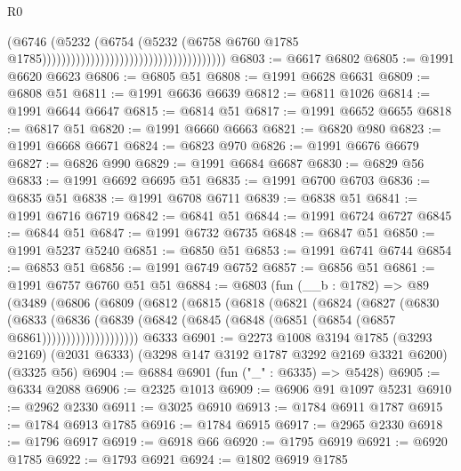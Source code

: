 \begin{lexlean}{R0}
\begin{coremodule}
                                                                      (@6746
                                                                        (@5232
                                                                          (@6754
                                                                            (@5232
                                                                              (@6758
                                                                                @6760
                                                                                @1785
                                                                                @1785))))))))))))))))))))))))))))))))))))))
@6803 := @6617 @6802
@6805 := @1991 @6620 @6623
@6806 := @6805 @51
@6808 := @1991 @6628 @6631
@6809 := @6808 @51
@6811 := @1991 @6636 @6639
@6812 := @6811 @1026
@6814 := @1991 @6644 @6647
@6815 := @6814 @51
@6817 := @1991 @6652 @6655
@6818 := @6817 @51
@6820 := @1991 @6660 @6663
@6821 := @6820 @980
@6823 := @1991 @6668 @6671
@6824 := @6823 @970
@6826 := @1991 @6676 @6679
@6827 := @6826 @990
@6829 := @1991 @6684 @6687
@6830 := @6829 @56
@6833 := @1991 @6692 @6695 @51
@6835 := @1991 @6700 @6703
@6836 := @6835 @51
@6838 := @1991 @6708 @6711
@6839 := @6838 @51
@6841 := @1991 @6716 @6719
@6842 := @6841 @51
@6844 := @1991 @6724 @6727
@6845 := @6844 @51
@6847 := @1991 @6732 @6735
@6848 := @6847 @51
@6850 := @1991 @5237 @5240
@6851 := @6850 @51
@6853 := @1991 @6741 @6744
@6854 := @6853 @51
@6856 := @1991 @6749 @6752
@6857 := @6856 @51
@6861 := @1991 @6757 @6760 @51 @51
@6884 := @6803
    (fun (__b : @1782) =>
    @89
      (@3489
        (@6806
          (@6809
            (@6812
              (@6815
                (@6818
                  (@6821
                    (@6824
                      (@6827
                        (@6830
                          (@6833
                            (@6836
                              (@6839
                                (@6842 (@6845 (@6848 (@6851 (@6854 (@6857 @6861))))))))))))))))))))
    @6333
@6901 := @2273
    @1008
    @3194
    @1785
    (@3293 @2169)
    (@2031 @6333)
    (@3298 @147 @3192 @1787 @3292 @2169 @3321 @6200)
    (@3325 @56)
@6904 := @6884 @6901 (fun ("_" : @6335) => @5428)
@6905 := @6334 @2088
@6906 := @2325 @1013
@6909 := @6906 @91 @1097 @5231
@6910 := @2962 @2330
@6911 := @3025 @6910
@6913 := @1784 @6911 @1787
@6915 := @1784 @6913 @1785
@6916 := @1784 @6915
@6917 := @2965 @2330
@6918 := @1796 @6917
@6919 := @6918 @66
@6920 := @1795 @6919
@6921 := @6920 @1785
@6922 := @1793 @6921
@6924 := @1802 @6919 @1785

\end{coremodule}
\end{lexlean}
